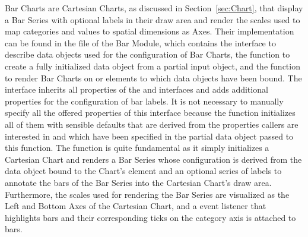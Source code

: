 Bar Charts are Cartesian Charts, as discussed in
Section~\ref{sec:Chart}, that display a Bar Series with optional
labels in their draw area and render the scales used to map categories
and values to spatial dimensions as Axes.  Their implementation can be
found in the  file of the Bar Module, which
contains the  interface to describe data objects used
for the configuration of Bar Charts, the  function
to create a fully initialized  data object from a
partial input object, and the  function to render
Bar Charts on  or  elements to which
 data objects have been bound.  The 
interface inherits all properties of the  and
 interfaces and adds additional properties for the
configuration of bar labels.  It is not necessary to manually specify
all the offered properties of this interface because the
 function initializes all of them with sensible
defaults that are derived from the properties callers are interested
in and which have been specified in the partial data object passed to
this function.  The  function is quite
fundamental as it simply initializes a Cartesian Chart and renders a
Bar Series whose configuration is derived from the 
data object bound to the Chart's element and an optional series of
labels to annotate the bars of the Bar Series into the Cartesian
Chart's draw area.  Furthermore, the scales used for rendering the Bar
Series are visualized as the Left and Bottom Axes of the Cartesian
Chart, and a  event listener that highlights bars and
their corresponding ticks on the category axis is attached to bars.

